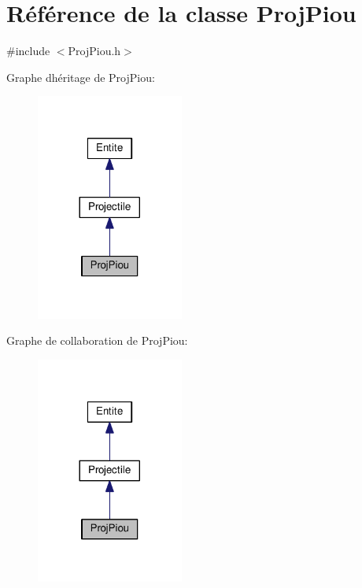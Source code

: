 \hypertarget{class_proj_piou}{}\section{Référence de la classe Proj\+Piou}
\label{class_proj_piou}


{\ttfamily \#include $<$Proj\+Piou.\+h$>$}



Graphe d\textquotesingle{}héritage de Proj\+Piou\+:\nopagebreak
\begin{figure}[H]
\begin{center}
\leavevmode
\includegraphics[width=137pt]{class_proj_piou__inherit__graph}
\end{center}
\end{figure}


Graphe de collaboration de Proj\+Piou\+:\nopagebreak
\begin{figure}[H]
\begin{center}
\leavevmode
\includegraphics[width=137pt]{class_proj_piou__coll__graph}
\end{center}
\end{figure}
